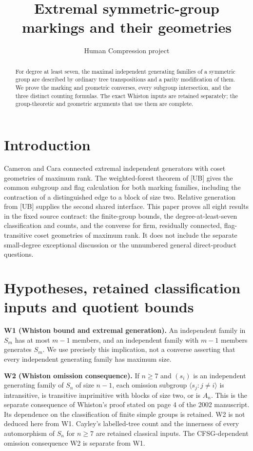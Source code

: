 
\title{Extremal symmetric-group markings and their geometries}
\author{Human Compression project}
\date{}

\maketitle
\begin{abstract}
For degree at least seven, the maximal independent generating families of a symmetric group are described by ordinary tree transpositions and a parity modification of them. We prove the marking and geometric converses, every subgroup intersection, and the three distinct counting formulas. The exact Whiston inputs are retained separately; the group-theoretic and geometric arguments that use them are complete.
\end{abstract}
\section{Introduction}
Cameron and Cara connected extremal independent generators with coset geometries of maximum rank. The weighted-forest theorem of [UB] gives the common subgroup and flag calculation for both marking families, including the contraction of a distinguished edge to a block of size two. Relative generation from [UB] supplies the second shared interface. This paper proves all eight results in the fixed source contract: the finite-group bounds, the degree-at-least-seven classification and counts, and the converse for firm, residually connected, flag-transitive coset geometries of maximum rank. It does not include the separate small-degree exceptional discussion or the unnumbered general direct-product questions.
\section{Hypotheses, retained classification inputs and quotient bounds}
\textbf{W1 (Whiston bound and extremal generation).} An independent family in \(S_m\) has at most \(m-1\) members, and an independent family with \(m-1\) members generates \(S_m\). We use precisely this implication, not a converse asserting that every independent generating family has maximum size.

\textbf{W2 (Whiston omission consequence).} If \(n\geq7\) and \((s_i)\) is an independent generating family of \(S_n\) of size \(n-1\), each omission subgroup \(\langle s_j:j\ne i\rangle\) is intransitive, is transitive imprimitive with blocks of size two, or is \(A_n\). This is the separate consequence of Whiston's proof stated on page 4 of the 2002 manuscript. Its dependence on the classification of finite simple groups is retained. W2 is not deduced here from W1.
Cayley's labelled-tree count and the innerness of every automorphism of \(S_n\) for \(n\geq7\) are retained classical inputs. The CFSG-dependent omission consequence W2 is separate from W1.

